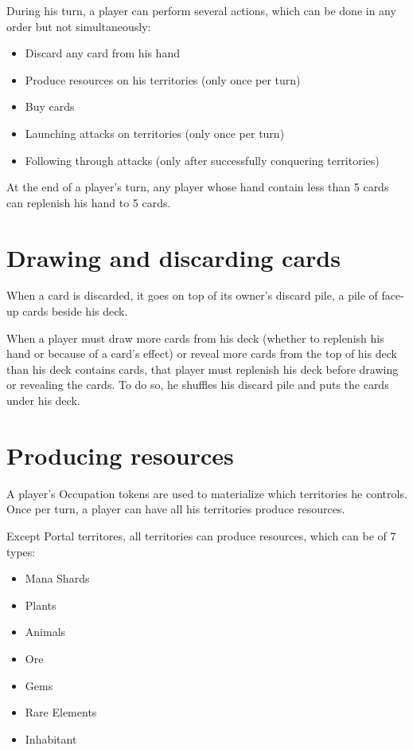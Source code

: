 \documentclass[a4paper]{article}
\begin{document}
    During his turn, a player can perform several actions, which can be done in any order but not simultaneously:

    \begin{itemize}
        \item Discard any card from his hand
        \item Produce resources on his territories (only once per turn)
        \item Buy cards
        \item Launching attacks on territories (only once per turn)
        \item Following through attacks (only after successfully conquering territories)
    \end{itemize}

    At the end of a player's turn, any player whose hand contain less than 5 cards can replenish his hand to 5 cards.


\newpage
\section{Drawing and discarding cards}

    When a card is discarded, it goes on top of its owner's discard pile, a pile of face-up cards beside his deck.

    When a player must draw more cards from his deck (whether to replenish his hand or because of a card's effect)
    or reveal more cards from the top of his deck than his deck contains cards, that player must replenish his deck before
    drawing or revealing the cards.
    To do so, he shuffles his discard pile and puts the cards under his deck.



\section{Producing resources}

    A player's Occupation tokens are used to materialize which territories he controls.
    Once per turn, a player can have all his territories produce resources.

    Except Portal territores, all territories can produce resources, which can be of 7 types:

    \begin{itemize}
        \item Mana Shards
        \item Plants
        \item Animals
        \item Ore
        \item Gems
        \item Rare Elements
        \item Inhabitant
    \end{itemize}
\end{document}
